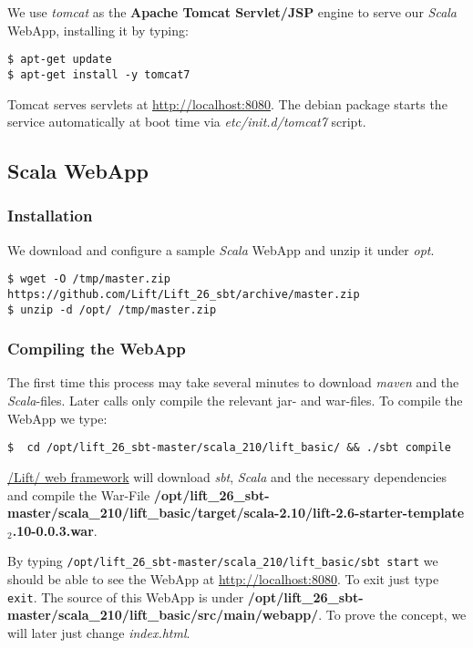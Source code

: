 \documentclass[11pt]{article}
\begin{document}
We use \emph{tomcat} as the \textbf{Apache Tomcat Servlet/JSP} engine to serve our \emph{Scala} WebApp, installing it by typing:

\begin{verbatim}
$ apt-get update
$ apt-get install -y tomcat7
\end{verbatim}
Tomcat serves servlets  at \href{http://localhost:8080}{http://localhost:8080}. The debian package starts the service automatically at boot time via \emph{etc/init.d/tomcat7} script.
\subsection{Scala WebApp}
\label{sec-3-3}
\subsubsection{Installation}
\label{sec-3-3-1}

We download and configure a sample \emph{Scala} WebApp and unzip it under \emph{opt}.

\begin{verbatim}
$ wget -O /tmp/master.zip https://github.com/Lift/Lift_26_sbt/archive/master.zip
$ unzip -d /opt/ /tmp/master.zip
\end{verbatim}
\subsubsection{Compiling the WebApp}
\label{sec-3-3-2}

The first time this process may take several minutes to download \emph{maven} and the \emph{Scala}-files. Later calls only compile the relevant jar- and war-files. To compile the WebApp we type:

\begin{verbatim}
$  cd /opt/lift_26_sbt-master/scala_210/lift_basic/ && ./sbt compile
\end{verbatim}

\href{http:///Lift/web.net/getting_started}{/Lift/ web framework}  will download \emph{sbt}, \emph{Scala} and the necessary dependencies and compile the War-File \textbf{/opt/lift\_26\_sbt-master/scala\_210/lift\_basic/target/scala-2.10/lift-2.6-starter-template$_2$.10-0.0.3.war}. 
 
By typing \texttt{/opt/lift\_26\_sbt-master/scala\_210/lift\_basic/sbt  start} we should be able to see the WebApp at \href{http://localhost:8080}{http://localhost:8080}. To exit just type \texttt{exit}. The source of this WebApp is under \textbf{/opt/lift\_26\_sbt-master/scala\_210/lift\_basic/src/main/webapp/}. To prove the concept, we will later just change \emph{index.html}.
\end{document}
